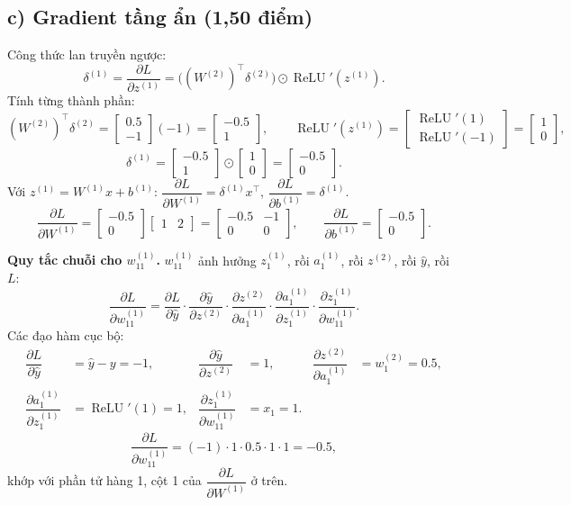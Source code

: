 \documentclass[12pt,a4paper]{article}
\newcommand{\relu}{\operatorname{ReLU}}
\newcommand{\pd}[2]{\dfrac{\partial #1}{\partial #2}}
\begin{document}
\subsection*{c) Gradient tầng ẩn (1,50 điểm)}

Công thức lan truyền ngược:
\[
\delta^{(1)}=\pd{L}{z^{(1)}}=\big((W^{(2)})^{\top}\delta^{(2)}\big)\odot\relu'(z^{(1)}).
\]
Tính từng thành phần:
\[
(W^{(2)})^{\top}\delta^{(2)}=\begin{bmatrix}0.5\\-1\end{bmatrix}(-1)=\begin{bmatrix}-0.5\\1\end{bmatrix},\qquad
\relu'(z^{(1)})=\begin{bmatrix}\relu'(1)\\\relu'(-1)\end{bmatrix}=\begin{bmatrix}1\\0\end{bmatrix},
\]
\[
\delta^{(1)}=\begin{bmatrix}-0.5\\1\end{bmatrix}\odot\begin{bmatrix}1\\0\end{bmatrix}=\boxed{\begin{bmatrix}-0.5\\0\end{bmatrix}}.
\]
Với $z^{(1)}=W^{(1)}x+b^{(1)}$: $\pd{L}{W^{(1)}}=\delta^{(1)}x^{\top}$, $\pd{L}{b^{(1)}}=\delta^{(1)}$.
\[
\pd{L}{W^{(1)}}=\begin{bmatrix}-0.5\\0\end{bmatrix}\begin{bmatrix}1&2\end{bmatrix}
=\boxed{\begin{bmatrix}-0.5&-1\\0&0\end{bmatrix}},\qquad
\pd{L}{b^{(1)}}=\boxed{\begin{bmatrix}-0.5\\0\end{bmatrix}}.
\]

\textbf{Quy tắc chuỗi cho $w^{(1)}_{11}$.} $w^{(1)}_{11}$ ảnh hưởng $z^{(1)}_1$, rồi $a^{(1)}_1$, rồi $z^{(2)}$, rồi $\hat y$, rồi $L$:
\[
\pd{L}{w^{(1)}_{11}}
=\pd{L}{\hat y}\cdot\pd{\hat y}{z^{(2)}}\cdot\pd{z^{(2)}}{a^{(1)}_1}\cdot\pd{a^{(1)}_1}{z^{(1)}_1}\cdot\pd{z^{(1)}_1}{w^{(1)}_{11}}.
\]
Các đạo hàm cục bộ:
\begin{align*}
\pd{L}{\hat y}&=\hat y-y=-1, &
\pd{\hat y}{z^{(2)}}&=1, &
\pd{z^{(2)}}{a^{(1)}_1}&=w^{(2)}_{1}=0.5,\\
\pd{a^{(1)}_1}{z^{(1)}_1}&=\relu'(1)=1, &
\pd{z^{(1)}_1}{w^{(1)}_{11}}&=x_1=1.
\end{align*}
\[
\pd{L}{w^{(1)}_{11}}=(-1)\cdot1\cdot0.5\cdot1\cdot1=\boxed{-0.5},
\]
khớp với phần tử hàng 1, cột 1 của $\pd{L}{W^{(1)}}$ ở trên.
\end{document}
